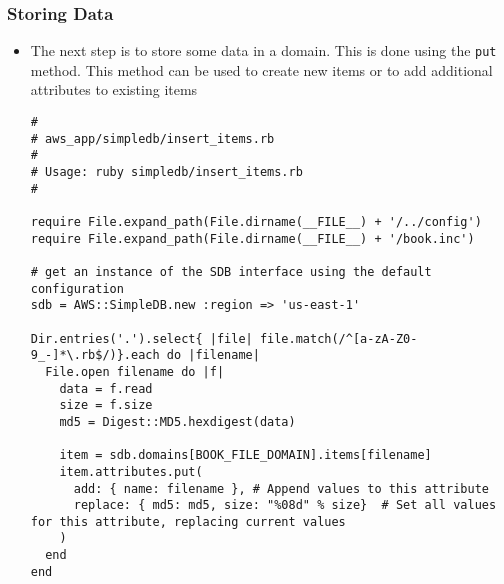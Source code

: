 \documentclass{beamer}
\begin{document}
\begin{frame}
\frametitle{Storing Data}
\begin{itemize}
\item The next step is to store some data in a domain. This is done using the
\texttt{put} method. This method can be used to create new items or to add
additional attributes to existing items

\lstset{language=Ruby, style=eclipse}
\begin{lstlisting}
#
# aws_app/simpledb/insert_items.rb
#
# Usage: ruby simpledb/insert_items.rb
#

require File.expand_path(File.dirname(__FILE__) + '/../config')
require File.expand_path(File.dirname(__FILE__) + '/book.inc')

# get an instance of the SDB interface using the default configuration
sdb = AWS::SimpleDB.new :region => 'us-east-1'

Dir.entries('.').select{ |file| file.match(/^[a-zA-Z0-9_-]*\.rb$/)}.each do |filename|
  File.open filename do |f|
    data = f.read
    size = f.size
    md5 = Digest::MD5.hexdigest(data)

    item = sdb.domains[BOOK_FILE_DOMAIN].items[filename]
    item.attributes.put(
      add: { name: filename }, # Append values to this attribute
      replace: { md5: md5, size: "%08d" % size}  # Set all values for this attribute, replacing current values
    )
  end
end
\end{lstlisting}
\end{itemize}
\end{frame}

\end{document}
